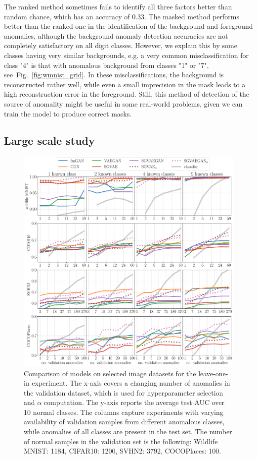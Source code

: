 The ranked method sometimes fails to identify all three factors better than random chance, which has an accuracy of 0.33. The masked method performs better than the ranked one in the identification of the background and foreground anomalies, although the background anomaly detection accuracies are not completely satisfactory on all digit classes. However, we explain this by some classes having very similar backgrounds, e.g. a very common misclassification for class "4" is that with anomalous background from classes "1" or "7", see~Fig.~\ref{fig:wmnist_grid}. In these misclassifications, the background is reconstructed rather well, while even a small imprecision in the mask leads to a high reconstruction error in the foreground. Still, this method of detection of the source of anomality might be useful in some real-world problems, given we can train the model to produce correct masks. 

\subsection{Large scale study} \label{sec:benchmarks}
\begin{figure}[ht!]
    \centering
        \includegraphics[width=\textwidth]{data/chapter_sgvaegan/fig8_all.pdf}
    \caption{Comparison of models on selected image datasets for the leave-one-in experiment. The x-axis covers a changing number of anomalies in the validation dataset, which is used for hyperparameter selection and $\alpha$ computation. The y-axis reports the average test AUC over 10 normal classes. The columns capture experiments with varying availability of validation samples from different anomalous classes, while anomalies of all classes are present in the test set. The number of normal samples in the validation set is the following: Wildlife MNIST: 1184, CIFAR10: 1200, SVHN2: 3792, COCOPlaces: 100.}
    \label{fig:kplots}
\end{figure}

